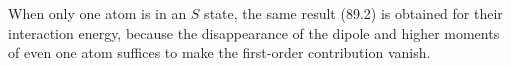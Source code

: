 When only one atom is in an $S$ state, the same result (89.2) is obtained for their interaction energy, because the disappearance of the dipole and higher moments of even one atom suffices to make the first-order contribution vanish.
